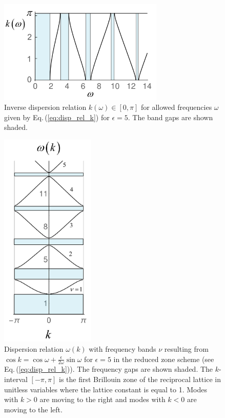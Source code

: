 %
\begin{figure}
    \includegraphics[width=0.7\textwidth, keepaspectratio]{figures/system/komega.png}
    \caption{Inverse dispersion relation $k(\omega) \in [0,\pi]$ 
    for allowed frequencies $\omega$ given by Eq.\,(\ref{eq:disp_rel_k}) for $\epsilon=5$. 
    The band gaps are shown shaded.}  
    \label{fig:komega}
\end{figure}

\begin{figure}
    \includegraphics[width=0.4\textwidth, keepaspectratio]{figures/system/omegak.png}
    \caption{Dispersion relation $\omega(k)$ with frequency bands $\nu$ resulting from 
    $\cos k = \cos{\omega} + \frac{\epsilon}{2 \omega} \sin{\omega}$ for $\epsilon=5$
    in the reduced zone scheme (see Eq.\,(\ref{eq:disp_rel_k})). 
    The frequency gaps are shown shaded. The $k$-interval $[-\pi,\pi]$ 
    is the first Brillouin zone of the reciprocal lattice in 
    unitless variables where the lattice constant is equal to 1.
    Modes with $k>0$ are moving to the right and modes with $k<0$
    are moving to the left.}
    \label{fig:omegak}
\end{figure}

